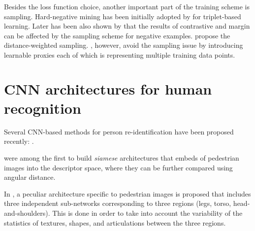 






Besides the loss function choice, another important part of the training scheme is sampling. Hard-negative mining has been initially adopted by \citep{SchroffKP15} for triplet-based learning. Later has been also shown by \citep{wu2017sampling} that the results of contrastive  and margin  can be affected by the sampling scheme for negative examples. \citep{wu2017sampling} propose the distance-weighted sampling. \citep{movshovitz2017no}, however, avoid the sampling issue by introducing learnable proxies each of which is representing multiple training data points.



\section{CNN architectures for human recognition}
Several CNN-based methods for person re-identification have been proposed recently: \citep{Li14, yi2014deep, ahmed2015improved, chen2016deep, VariorHW16, VariorSLXW16,SuZX0T16}. 

\citep{yi2014deep} were among the first to build \textit{siamese} architectures that embeds of pedestrian images into the descriptor space, where they can be further compared using angular distance. 

In \citep{yi2014deep}, a peculiar architecture specific to pedestrian images is proposed that includes three independent sub-networks corresponding to three regions (legs, torso, head-and-shoulders). This is done in order to take into account the variability of the statistics of textures, shapes, and articulations between the three regions. %

